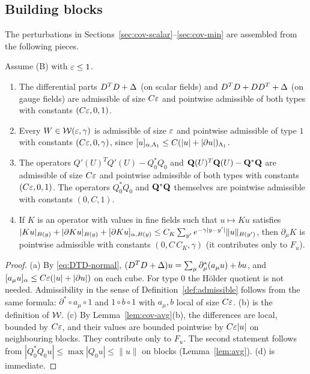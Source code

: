 \subsection{Building blocks}\label{ss:13.4}

The perturbations in Sections~\ref{sec:cov-scalar}--\ref{sec:cov-min} are assembled from the following pieces.

\begin{lemma}\label{lem:blocks}
Assume (B) with $\varepsilon\le1$.
\begin{enumerate}[label=(\alph*)]
\item The differential parts $D^TD+\Delta$ (on scalar fields) and $D^TD+DD^T+\Delta$ (on gauge fields) are admissible of size $C\varepsilon$ and pointwise admissible of both types with constants $(C\varepsilon,0,1)$.
\item Every $W\in\mathcal W(\varepsilon,\gamma)$ is admissible of size $\varepsilon$ and pointwise admissible of type $1$ with constants $(C\varepsilon,0,\gamma)$, since $[u]_{\alpha,\Lambda_1}\le C(|u|+|\partial u|)_{\Lambda_1}$.
\item The operators $Q'(U)^TQ'(U)-Q_0^*Q_0$ and $\mathbf Q(U)^T\mathbf Q(U)-\mathbf Q^*\mathbf Q$ are admissible of size $C\varepsilon$ and pointwise admissible of both types with constants $(C\varepsilon,0,1)$. The operators $Q_0^*Q_0$ and $\mathbf Q^*\mathbf Q$ themselves are pointwise admissible with constants $(0,C,1)$.
\item If $K$ is an operator with values in fine fields such that $u\mapsto Ku$ satisfies $|Ku|_{B(y)}+|\partial Ku|_{B(y)}+[\partial Ku]_{\alpha,B(y)}\le C_K\sum_{y'}e^{-\gamma|y-y'|}\|u\|_{B(y')}$, then $\partial_\mu K$ is pointwise admissible with constants $(0,C\,C_K,\gamma)$ (it contributes only to $F_u$).
\end{enumerate}
\end{lemma}

\begin{proof}
(a) By \eqref{eq:DTD-normal}, $(D^TD+\Delta)u=\sum_\mu\partial^*_\mu(a_\mu u)+bu$, and $[a_\mu u]_\alpha\le C\varepsilon(|u|+|\partial u|)$ on each cube. For type $0$ the H\"older quotient is not needed. Admissibility in the sense of Definition~\ref{def:admissible} follows from the same formula: $\partial^*\circ a_\mu\circ1$ and $1\circ b\circ1$ with $a_\mu,b$ local of size $C\varepsilon$. (b) is the definition of $\mathcal W$. (c) By Lemma~\ref{lem:cov-avg}(b), the differences are local, bounded by $C\varepsilon$, and their values are bounded pointwise by $C\varepsilon|u|$ on neighbouring blocks. They contribute only to $F_u$. The second statement follows from $|Q_0^*Q_0u|\le\max|Q_0u|\le\|u\|$ on blocks (Lemma~\ref{lem:avg}). (d) is immediate.
\end{proof}
